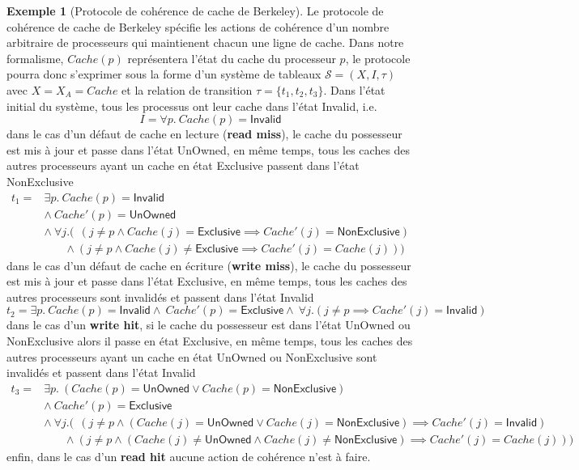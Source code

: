\documentclass[a4paper, twoside]{scrartcl}
\theoremstyle{plain}%
\theoremstyle{definition}
\newtheorem{exmp}{Exemple}[section]
\theoremstyle{remark}
\begin{document}
\begin{exmp}[Protocole de cohérence de cache de Berkeley]
  Le protocole de cohérence de cache de Berkeley spécifie les actions
  de cohérence d'un nombre arbitraire de processeurs qui maintienent
  chacun une ligne de cache. Dans notre formalisme, $Cache(p)$
  représentera l'état du cache du processeur $p$, le protocole pourra
  donc s'exprimer sous la forme d'un système de tableaux $\mathcal{S}
  = (X, I, \tau)$ avec $X = X_A = { Cache }$ et la relation de
  transition $\tau = \{t_1, t_2, t_3\}$. Dans l'état initial du
  système, tous les processus ont leur cache dans l'état
  \textsf{Invalid}, i.e.
  \[
  I = \forall p.~ Cache(p) = \mathsf{Invalid}
  \]
  dans le cas d'un défaut de cache en lecture (\textbf{read miss}), le
  cache du possesseur est mis à jour et passe dans l'état
  \textsf{UnOwned}, en même temps, tous les caches des autres processeurs ayant
  un cache en état \textsf{Exclusive} passent dans l'état
  \textsf{NonExclusive}
  \[
  \begin{array}{rl}
    t_1 = & \exists p.~ Cache(p) = \mathsf{Invalid}\\
    & \land~ Cache'(p) = \mathsf{UnOwned} \\
    & \land~ \forall j. (~~
    (j \neq p \wedge Cache(j) = \mathsf{Exclusive} \implies Cache'(j) =
    \mathsf{NonExclusive})\\
    &
    ~~~~~~~~\land (j \neq p \wedge Cache(j) \neq \mathsf{Exclusive} \implies
    Cache'(j) = Cache(j))) 
  \end{array}
  \]
  dans le cas d'un défaut de cache en écriture (\textbf{write miss}), le
  cache du possesseur est mis à jour et passe dans l'état
  \textsf{Exclusive}, en même temps, tous les caches des autres processeurs sont
  invalidés et passent dans l'état \textsf{Invalid}
  \[
    t_2 = \exists p.~ Cache(p) = \mathsf{Invalid}
     \land~ Cache'(p) = \mathsf{Exclusive} 
     \land~ \forall j.
    (j \neq p \implies Cache'(j) = \mathsf{Invalid})
  \]
  dans le cas d'un \textbf{write hit}, si le cache du
  possesseur est dans l'état \textsf{UnOwned} ou \textsf{NonExclusive}
  alors il passe en état \textsf{Exclusive}, en même temps, tous les
  caches des autres processeurs ayant un cache en état \textsf{UnOwned} ou
  \textsf{NonExclusive} sont invalidés et passent dans l'état
  \textsf{Invalid}
  \[
  \begin{array}{rl}
    t_3 = & \exists p.~ (Cache(p) = \mathsf{UnOwned}  \vee Cache(p) =
    \mathsf{NonExclusive})\\
    & \land~ Cache'(p) = \mathsf{Exclusive} \\
    & \land~ \forall j. (~~
    (j \neq p \wedge (Cache(j) = \mathsf{UnOwned} \vee Cache(j) =
    \mathsf{NonExclusive}) \implies Cache'(j) =
    \mathsf{Invalid})\\
    &
    ~~~~~~~~\land (j \neq p \wedge (Cache(j) \neq \mathsf{UnOwned}
    \land Cache(j) \neq
    \mathsf{NonExclusive}) \implies
    Cache'(j) = Cache(j))) 
  \end{array}
  \]
  enfin, dans le cas d'un \textbf{read hit} aucune action de cohérence
  n'est à faire.


\end{exmp}
\end{document}
